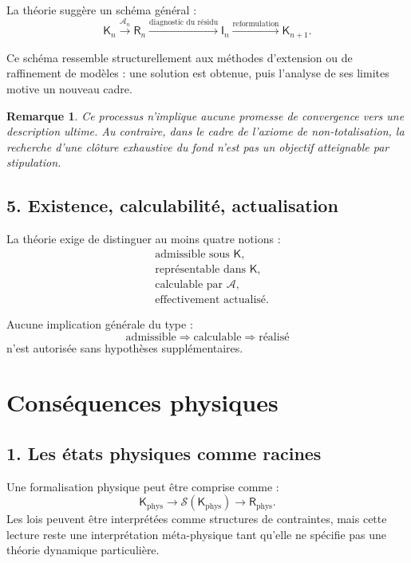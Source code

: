 \documentclass[11pt,a4paper]{article}
\newtheorem{remark}{Remarque}[section]
\newcommand{\Rac}{\mathsf{R}}
\newcommand{\Inrac}{\mathsf{I}}
\newcommand{\Cadre}{\mathsf{K}}
\newcommand{\Sol}{\mathcal{S}}
\begin{document}
La théorie suggère un schéma général :
\[
\Cadre_n
\xrightarrow{\mathcal A_n}
\Rac_n
\xrightarrow{\text{diagnostic du résidu}}
\Inrac_n
\xrightarrow{\text{reformulation}}
\Cadre_{n+1}.
\]

Ce schéma ressemble structurellement aux méthodes d'extension ou de raffinement
de modèles : une solution est obtenue, puis l'analyse de ses limites motive un
nouveau cadre.

\begin{remark}
Ce processus n'implique aucune promesse de convergence vers une description
ultime. Au contraire, dans le cadre de l'axiome de non-totalisation, la
recherche d'une clôture exhaustive du fond n'est pas un objectif atteignable
par stipulation.
\end{remark}

\subsection{5. Existence, calculabilité, actualisation}

La théorie exige de distinguer au moins quatre notions :
\[
\begin{aligned}
&\text{admissible sous }\Cadre,\\
&\text{représentable dans }\Cadre,\\
&\text{calculable par }\mathcal A,\\
&\text{effectivement actualisé.}
\end{aligned}
\]

Aucune implication générale du type :
\[
\text{admissible}\Rightarrow\text{calculable}\Rightarrow\text{réalisé}
\]
n'est autorisée sans hypothèses supplémentaires.

\section{Conséquences physiques}

\subsection{1. Les états physiques comme racines}

Une formalisation physique peut être comprise comme :
\[
\Cadre_{\mathrm{phys}}
\to
\Sol(\Cadre_{\mathrm{phys}})
\to
\Rac_{\mathrm{phys}}.
\]
Les lois peuvent être interprétées comme structures de contraintes, mais cette
lecture reste une interprétation méta-physique tant qu'elle ne spécifie pas une
théorie dynamique particulière.
\end{document}
